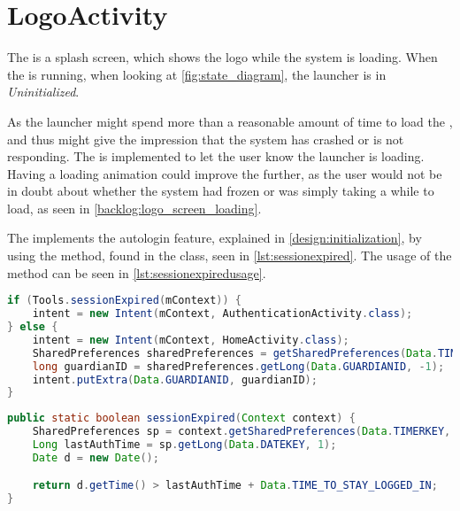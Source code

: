 \section{LogoActivity}
The  is a splash screen, which shows the \giraf[] logo while the system is loading. 
When the  is running, when looking at \autoref{fig:state_diagram}, the launcher is in \emph{Uninitialized}. 

As the launcher might spend more than a reasonable amount of time to load the , and thus might give the impression that the system has crashed or is not responding. 
The  is implemented to let the user know the launcher is loading.
Having a loading animation could improve the  further, as the user would not be in doubt about whether the system had frozen or was simply taking a while to load, as seen in \autoref{backlog:logo_screen_loading}.

The  implements the autologin feature, explained in \autoref{design:initialization}, by using the  method, found in the  class, seen in \autoref{lst:sessionexpired}.
The usage of the  method can be seen in \autoref{lst:sessionexpiredusage}.

\begin{lstlisting}[style=sourceCode, language=JAVA, caption=Snippet of LogoActivity.java, label=lst:sessionexpiredusage] 
if (Tools.sessionExpired(mContext)) {
	intent = new Intent(mContext, AuthenticationActivity.class);
} else {
	intent = new Intent(mContext, HomeActivity.class);
	SharedPreferences sharedPreferences = getSharedPreferences(Data.TIMERKEY, 0);
	long guardianID = sharedPreferences.getLong(Data.GUARDIANID, -1);
	intent.putExtra(Data.GUARDIANID, guardianID);
}
\end{lstlisting}


\begin{lstlisting}[style=sourceCode, language=JAVA, caption=Snippet of Tools.java, label=lst:sessionexpired]
public static boolean sessionExpired(Context context) {
	SharedPreferences sp = context.getSharedPreferences(Data.TIMERKEY, 0);
	Long lastAuthTime = sp.getLong(Data.DATEKEY, 1);
	Date d = new Date();

	return d.getTime() > lastAuthTime + Data.TIME_TO_STAY_LOGGED_IN;
}
\end{lstlisting}